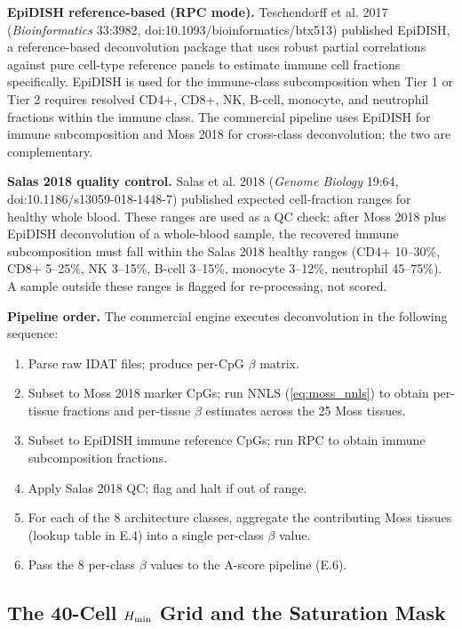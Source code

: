 \documentclass[12pt,a4paper]{article}
\begin{document}
\textbf{EpiDISH reference-based (RPC mode).} Teschendorff et al. 2017
(\textit{Bioinformatics} 33:3982, doi:10.1093/bioinformatics/btx513)
published EpiDISH, a reference-based deconvolution package that uses
robust partial correlations against pure cell-type reference panels
to estimate immune cell fractions specifically. EpiDISH is used for
the immune-class subcomposition when Tier 1 or Tier 2 requires
resolved CD4+, CD8+, NK, B-cell, monocyte, and neutrophil fractions
within the immune class. The commercial pipeline uses EpiDISH for
immune subcomposition and Moss 2018 for cross-class deconvolution;
the two are complementary.

\textbf{Salas 2018 quality control.} Salas et al. 2018
(\textit{Genome Biology} 19:64, doi:10.1186/s13059-018-1448-7) published
expected cell-fraction ranges for healthy whole blood. These ranges are
used as a QC check: after Moss 2018 plus EpiDISH deconvolution of a
whole-blood sample, the recovered immune subcomposition must fall
within the Salas 2018 healthy ranges (CD4+ 10--30\%, CD8+ 5--25\%,
NK 3--15\%, B-cell 3--15\%, monocyte 3--12\%, neutrophil 45--75\%). A
sample outside these ranges is flagged for re-processing, not scored.

\textbf{Pipeline order.} The commercial engine executes deconvolution
in the following sequence:
\begin{enumerate}
\item Parse raw IDAT files; produce per-CpG $\beta$ matrix.
\item Subset to Moss 2018 marker CpGs; run NNLS (\ref{eq:moss_nnls})
to obtain per-tissue fractions and per-tissue $\beta$ estimates
across the 25 Moss tissues.
\item Subset to EpiDISH immune reference CpGs; run RPC to obtain
immune subcomposition fractions.
\item Apply Salas 2018 QC; flag and halt if out of range.
\item For each of the 8 architecture classes, aggregate the
contributing Moss tissues (lookup table in E.4) into a single
per-class $\beta$ value.
\item Pass the 8 per-class $\beta$ values to the A-score pipeline
(E.6).
\end{enumerate}

\subsection{The 40-Cell $H_{\rm min}$ Grid and the Saturation Mask}
\label{subsec:hmin_grid_sat_mask}
\end{document}
